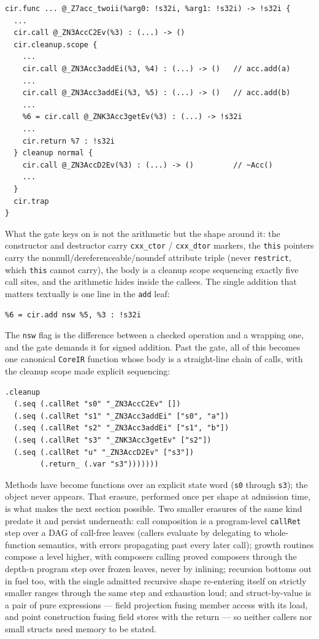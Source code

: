 \begin{verbatim}
cir.func ... @_Z7acc_twoii(%arg0: !s32i, %arg1: !s32i) -> !s32i {
  ...
  cir.call @_ZN3AccC2Ev(%3) : (...) -> ()
  cir.cleanup.scope {
    ...
    cir.call @_ZN3Acc3addEi(%3, %4) : (...) -> ()   // acc.add(a)
    ...
    cir.call @_ZN3Acc3addEi(%3, %5) : (...) -> ()   // acc.add(b)
    ...
    %6 = cir.call @_ZNK3Acc3getEv(%3) : (...) -> !s32i
    ...
    cir.return %7 : !s32i
  } cleanup normal {
    cir.call @_ZN3AccD2Ev(%3) : (...) -> ()         // ~Acc()
    ...
  }
  cir.trap
}
\end{verbatim}

What the gate keys on is not the arithmetic but the shape around it:
the constructor and destructor carry \texttt{cxx\_ctor} /
\texttt{cxx\_dtor} markers, the \texttt{this} pointers carry the
nonnull/dereferenceable/noundef attribute triple (never
\texttt{restrict}, which \texttt{this} cannot carry), the body is a
cleanup scope sequencing exactly five call sites, and the arithmetic
hides inside the callees. The single addition that matters textually is
one line in the \texttt{add} leaf:

\begin{verbatim}
%6 = cir.add nsw %5, %3 : !s32i
\end{verbatim}

The \texttt{nsw} flag is the difference between a checked operation and
a wrapping one, and the gate demands it for signed addition. Past the
gate, all of this becomes one canonical \texttt{CoreIR} function whose
body is a straight-line chain of calls, with the cleanup scope made
explicit sequencing:

\begin{verbatim}
.cleanup
  (.seq (.callRet "s0" "_ZN3AccC2Ev" [])
  (.seq (.callRet "s1" "_ZN3Acc3addEi" ["s0", "a"])
  (.seq (.callRet "s2" "_ZN3Acc3addEi" ["s1", "b"])
  (.seq (.callRet "s3" "_ZNK3Acc3getEv" ["s2"])
  (.seq (.callRet "u" "_ZN3AccD2Ev" ["s3"])
        (.return_ (.var "s3")))))))
\end{verbatim}

Methods have become functions over an explicit state word
(\texttt{s0} through \texttt{s3}); the object never appears. That
erasure, performed once per shape at admission time, is what makes the
next section possible. Two smaller erasures of the same kind predate
it and persist underneath: call composition is a program-level
\texttt{callRet} step over a DAG of call-free leaves (callers
evaluate by delegating to whole-function semantics, with errors
propagating past every later call); growth routines compose a level
higher, with composers calling proved composers through the depth-n
program step over frozen leaves, never by inlining; recursion bottoms
out in fuel too, with the single admitted recursive shape re-entering
itself on strictly smaller ranges through the same step and exhaustion
loud; and struct-by-value is a pair of
pure expressions --- field projection fusing member access with its
load, and point construction fusing field stores with the return ---
so neither callers nor small structs need memory to be stated.

